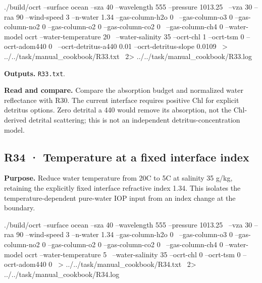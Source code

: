\noindent\begin{minipage}{\linewidth}
\begin{ManualCode}

./build/ocrt --surface ocean --sza 40 --wavelength 555 --pressure 1013.25 \
  --vza 30 --raa 90 --wind-speed 3 --n-water 1.34 --gas-column-h2o 0 \
  --gas-column-o3 0 --gas-column-no2 0 --gas-column-o2 0 --gas-column-co2 0 \
  --gas-column-ch4 0 --water-model ocrt --water-temperature 20 \
  --water-salinity 35 --ocrt-chl 1 --ocrt-tsm 0 --ocrt-adom440 0 \
  --ocrt-detritus-a440 0.01 --ocrt-detritus-slope 0.0109 \
  > ../../task/manual_cookbook/R33.txt \
  2> ../../task/manual_cookbook/R33.log

\end{ManualCode}
\end{minipage}\par

\textbf{Outputs. }\texttt{R33.txt}.

\textbf{Read and compare. }Compare the absorption budget and normalized water reflectance with R30. The current interface requires positive Chl for explicit detritus options. Zero detrital a 440 would remove its absorption, not the Chl-derived detrital scattering; this is not an independent detritus-concentration model.


\subsection{R34 · Temperature at a fixed interface index}
\label{sec:auto:09_cookbook:6.9}

\label{recipe:R34}

\textbf{Purpose. }Reduce water temperature from 20\textdegree{}C to 5\textdegree{}C at salinity 35 g/kg, retaining the explicitly fixed interface refractive index 1.34. This isolates the temperature-dependent pure-water IOP input from an index change at the boundary.

\noindent\begin{minipage}{\linewidth}
\begin{ManualCode}

./build/ocrt --surface ocean --sza 40 --wavelength 555 --pressure 1013.25 \
  --vza 30 --raa 90 --wind-speed 3 --n-water 1.34 --gas-column-h2o 0 \
  --gas-column-o3 0 --gas-column-no2 0 --gas-column-o2 0 --gas-column-co2 0 \
  --gas-column-ch4 0 --water-model ocrt --water-temperature 5 \
  --water-salinity 35 --ocrt-chl 0 --ocrt-tsm 0 --ocrt-adom440 0 \
  > ../../task/manual_cookbook/R34.txt \
  2> ../../task/manual_cookbook/R34.log

\end{ManualCode}
\end{minipage}\par


